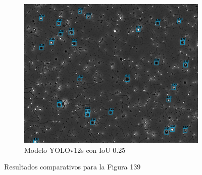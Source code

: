 \documentclass[12pt,a4paper,onecolumn,oneside]{report}
\begin{document}
\begin{figure}[H]
  \vspace{0.3cm}
  \begin{subfigure}[b]{0.48\textwidth}
    \centering
    \includegraphics[width=\textwidth]{figuras/evaluacion_cualitativa/139/139_v12_IoU0.25.jpg}
    \caption{Modelo YOLOv12s con IoU 0.25}
    \label{figyolov12s_IoU0.25_image_139}
  \end{subfigure}
  
  \caption{Resultados comparativos para la Figura 139}
  \label{fig:139}
\end{figure}
\end{document}
